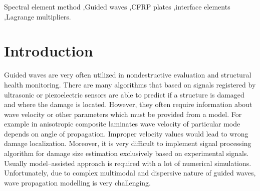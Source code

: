 \documentclass[preprint,12pt]{elsarticle}
\begin{document}
\begin{frontmatter}
		\begin{keyword}
			Spectral element method \sep Guided waves \sep CFRP plates \sep interface elements \sep Lagrange multipliers.
			
			
		\end{keyword}
		
	\end{frontmatter}
	
	
	\section{Introduction}
	Guided waves are very often utilized in nondestructive evaluation and structural health monitoring. There are many algorithms that based on signals registered by ultrasonic or piezoelectric sensors are able to predict if a structure is damaged and where the damage is located. However, they often require information about wave velocity or other parameters which must be provided from a model. For example in anisotropic composite laminates wave velocity of particular mode depends on angle of propagation. Improper velocity values would lead to wrong damage localization.  Moreover, it is very difficult to implement signal processing algorithm for damage size estimation exclusively based on experimental signals. Usually model--assisted approach is required with a lot of numerical simulations. Unfortunately, due to complex multimodal and dispersive nature of guided waves, wave propagation modelling is very challenging. 
	
\end{document}
